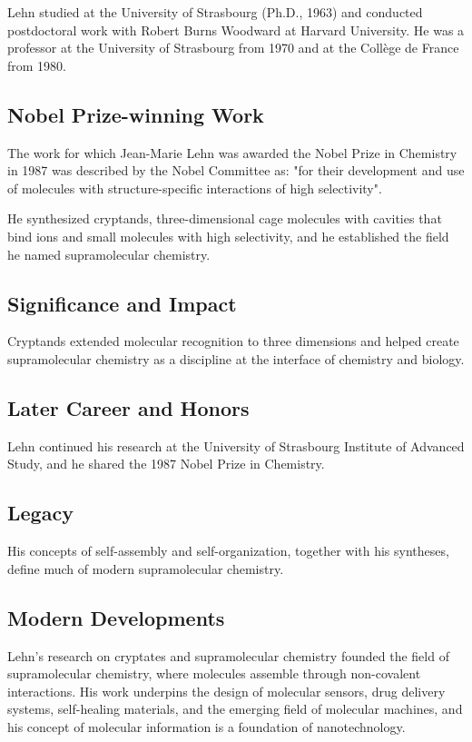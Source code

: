 Lehn studied at the University of Strasbourg (Ph.D., 1963) and conducted postdoctoral work with Robert Burns Woodward at Harvard University. He was a professor at the University of Strasbourg from 1970 and at the Collège de France from 1980.

\subsection*{Nobel Prize-winning Work}

The work for which Jean-Marie Lehn was awarded the Nobel Prize in Chemistry in 1987 was described by the Nobel Committee as: "for their development and use of molecules with structure-specific interactions of high selectivity".

He synthesized cryptands, three-dimensional cage molecules with cavities that bind ions and small molecules with high selectivity, and he established the field he named supramolecular chemistry.

\subsection*{Significance and Impact}

Cryptands extended molecular recognition to three dimensions and helped create supramolecular chemistry as a discipline at the interface of chemistry and biology.

\subsection*{Later Career and Honors}

Lehn continued his research at the University of Strasbourg Institute of Advanced Study, and he shared the 1987 Nobel Prize in Chemistry.

\subsection*{Legacy}

His concepts of self-assembly and self-organization, together with his syntheses, define much of modern supramolecular chemistry.

\subsection*{Modern Developments}

Lehn's research on cryptates and supramolecular chemistry founded the field of supramolecular chemistry, where molecules assemble through non-covalent interactions. His work underpins the design of molecular sensors, drug delivery systems, self-healing materials, and the emerging field of molecular machines, and his concept of molecular information is a foundation of nanotechnology.

